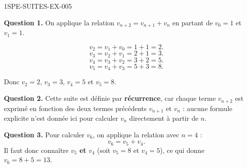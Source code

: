 \begin{corrige}{1SPE-SUITES-EX-005}


\textbf{Question 1.} On applique la relation $v_{n+2} = v_{n+1} + v_n$ en partant de $v_0 = 1$ et $v_1 = 1$.

\[
v_2 = v_1 + v_0 = 1 + 1 = 2.
\]
\[
v_3 = v_2 + v_1 = 2 + 1 = 3.
\]
\[
v_4 = v_3 + v_2 = 3 + 2 = 5.
\]
\[
v_5 = v_4 + v_3 = 5 + 3 = 8.
\]

Donc $v_2 = 2$, $v_3 = 3$, $v_4 = 5$ et $v_5 = 8$.


\textbf{Question 2.} Cette suite est définie par \textbf{récurrence}, car chaque terme $v_{n+2}$ est exprimé en fonction des deux termes précédents $v_{n+1}$ et $v_n$ : aucune formule explicite n'est donnée ici pour calculer $v_n$ directement à partir de $n$.


\textbf{Question 3.} Pour calculer $v_6$, on applique la relation avec $n = 4$ :
\[
v_6 = v_5 + v_4.
\]
Il faut donc connaître \textbf{$v_5$ et $v_4$} (soit $v_5 = 8$ et $v_4 = 5$), ce qui donne $v_6 = 8 + 5 = 13$.

\end{corrige}
